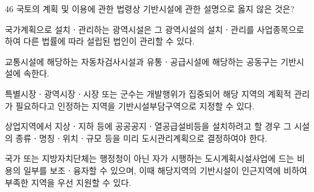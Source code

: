 \begin{question}{46}
국토의 계획 및 이용에 관한 법령상 기반시설에 관한 설명으로 옳지 않은 것은?
\begin{choices}
  \item 국가계획으로 설치ㆍ관리하는 광역시설은 그 광역시설의 설치ㆍ관리를 사업종목으로 하여 다른 법률에 따라 설립된 법인이 관리할 수 있다.
  \item 교통시설에 해당하는 자동차검사시설과 유통ㆍ공급시설에 해당하는 공동구는 기반시설에 속한다.
  \item 특별시장ㆍ광역시장ㆍ시장 또는 군수는 개발행위가 집중되어 해당 지역의 계획적 관리가 필요하다고 인정하는 지역을 기반시설부담구역으로 지정할 수 있다.
  \item 상업지역에서 지상ㆍ지하 등에 공공공지ㆍ열공급설비등을 설치하려고 할 경우 그 시설의 종류ㆍ명칭ㆍ위치ㆍ규모 등을 미리 도시관리계획으로 결정하여야 한다.
  \item 국가 또는 지방자치단체는 행정청이 아닌 자가 시행하는 도시계획시설사업에 드는 비용의 일부를 보조ㆍ융자할 수 있으며, 이때 해당지역의 기반시설이 인근지역에 비하여 부족한 지역을 우선 지원할 수 있다.
\end{choices}
\end{question}
